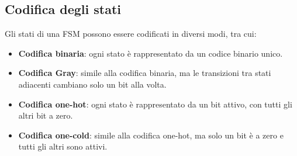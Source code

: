     \subsection{Codifica degli stati}
    Gli stati di una FSM possono essere codificati in diversi modi, tra cui:
    \begin{itemize}
        \item \textbf{Codifica binaria}: ogni stato è rappresentato da un codice binario unico.
        \item \textbf{Codifica Gray}: simile alla codifica binaria, ma le transizioni tra stati adiacenti cambiano solo un bit alla volta.
        \item \textbf{Codifica one-hot}: ogni stato è rappresentato da un bit attivo, con tutti gli altri bit a zero.
        \item \textbf{Codifica one-cold}: simile alla codifica one-hot, ma solo un bit è a zero e tutti gli altri sono attivi.
    \end{itemize}